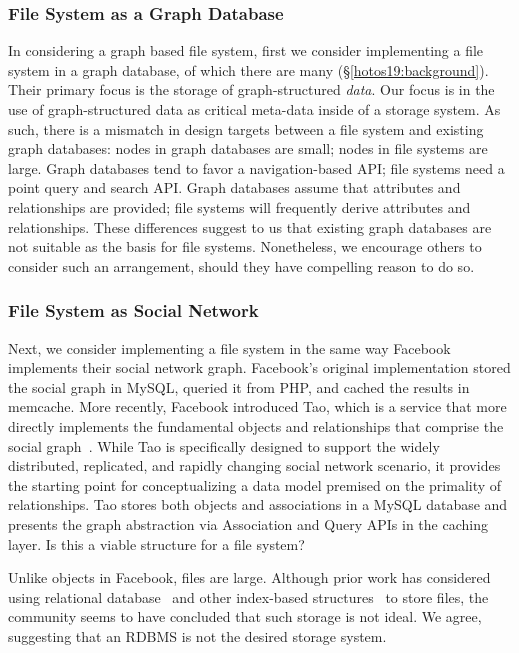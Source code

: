 \subsubsection{File System as a Graph Database}

In considering a graph based file system, first we consider
implementing a file system in a graph database, of which there are
many (\S \ref{hotos19:background}). Their primary focus is the storage of
graph-structured \textit{data}.  Our focus is in the use of graph-structured
data as critical meta-data inside of a storage system.
As such, there is a mismatch in design targets between a file system and
existing graph databases: nodes in graph databases are small; nodes in
file systems are large. Graph databases tend to favor a navigation-based API;
file systems need a point query and search API. Graph databases assume that
attributes and relationships are provided; file systems will frequently derive
attributes and relationships.
These differences suggest to us that existing graph databases are not suitable
as the basis for file systems.
Nonetheless, we encourage others to consider such an arrangement, should they
have compelling reason to do so.

\subsubsection{File System as Social Network}

Next, we consider implementing a file system in the same way Facebook
implements their social network graph.
Facebook's original implementation stored the social graph in MySQL, queried
it from PHP, and cached the results in memcache.
More recently, Facebook introduced Tao, which is a service that more directly
implements the fundamental objects and relationships that comprise the
social graph~\cite{bronson2013tao}.
While Tao is specifically designed to support the widely distributed,
replicated, and rapidly changing social network scenario, it provides the
starting point for conceptualizing a data model premised on the primality of
relationships.
Tao stores both objects and associations in a MySQL database and presents
the graph abstraction via Association and Query APIs in the caching layer.
Is this a viable structure for a file system?

Unlike objects in Facebook, files are large.
Although prior work has considered using relational
database~\cite{olson1993design} and other index-based
structures~\cite{spillane2013vttree}  to store files,
the community seems to have
concluded that such storage is not ideal. We agree, suggesting that
an RDBMS is not the desired storage system.

